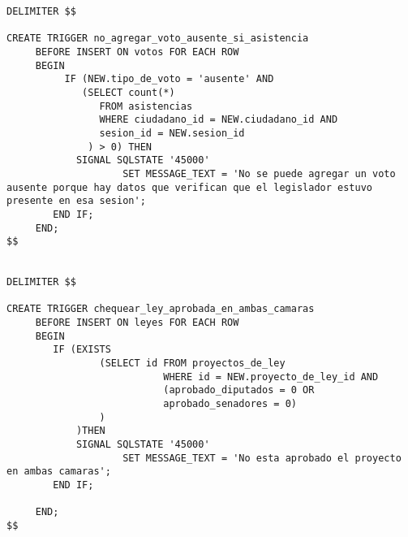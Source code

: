 \begin{verbatim}
DELIMITER $$

CREATE TRIGGER no_agregar_voto_ausente_si_asistencia
     BEFORE INSERT ON votos FOR EACH ROW
     BEGIN
          IF (NEW.tipo_de_voto = 'ausente' AND
             (SELECT count(*) 
          		FROM asistencias 	
          		WHERE ciudadano_id = NEW.ciudadano_id AND
          		sesion_id = NEW.sesion_id
              ) > 0) THEN 
     		SIGNAL SQLSTATE '45000'
                    SET MESSAGE_TEXT = 'No se puede agregar un voto ausente porque hay datos que verifican que el legislador estuvo presente en esa sesion';
     	END IF;
     END;
$$


DELIMITER $$ 
 
CREATE TRIGGER chequear_ley_aprobada_en_ambas_camaras
     BEFORE INSERT ON leyes FOR EACH ROW
     BEGIN
        IF (EXISTS
        		(SELECT id FROM proyectos_de_ley 
        				   WHERE id = NEW.proyecto_de_ley_id AND
        				   (aprobado_diputados = 0 OR
        				   aprobado_senadores = 0)
        		)
        	)THEN 
     		SIGNAL SQLSTATE '45000'
                    SET MESSAGE_TEXT = 'No esta aprobado el proyecto en ambas camaras';
     	END IF;
     	
     END;
$$
\end{verbatim}
